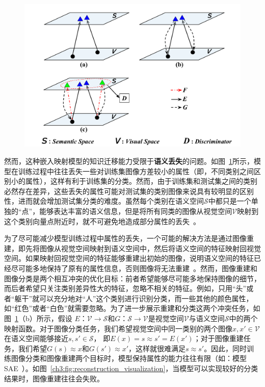 \begin{figure}
    \centering
        \includegraphics[width=0.98\linewidth]{chapter3/res/zsl_paradigms.pdf}
    \label{ch3:fig:zsl_paradigms}
\end{figure}

然而，这种嵌入映射模型的知识迁移能力受限于\textbf{语义丢失}的问题。如图~\ref{ch3:fig:zsl_paradigms}所示，模型在训练过程中往往丢失一些对训练集图像方差较小的属性（即，不同类别之间区别小的属性），这样有利于训练集的分类。然而，由于训练集和测试集之间的类别必然存在差异，这些丢失的属性可能对测试集的类别图像来说具有较明显的区别性，进而就会增加测试集分类的难度。虽然每个类别在语义空间$\mathcal{S}$中都只是一个单独的“点”，能够表达丰富的语义信息，但是将所有同类的图像从视觉空间$\mathcal{V}$映射到这个类别向量点附近时，就不可避免地造成部分属性的丢失~\cite{lazaridou2015hubness,fu2015transductive}。


为了尽可能减少模型训练过程中属性的丢失，一个可能的解决方法是通过图像重建，即先将图像从视觉空间映射到语义空间中，然后将语义空间的特征映射回视觉空间。如果映射回视觉空间的特征能够重建出初始的图像，说明语义空间的特征已经尽可能多地保持了原有的属性信息，否则图像将无法重建~\cite{kim2017learning,yi2017dualgan,zhu2017unpaired,he2016dual}。然而，图像重建和图像分类是两个相互冲突的优化目标：前者希望能够尽可能多地保持图像的细节，而后者希望只关注类别差异性大的特征，忽略不相关的特征。例如，只用“头”或者“躯干”就可以充分地对“人”这个类别进行识别分类，而一些其他的颜色属性，如“红色”或者“白色”就需要忽略。为了进一步展示重建和分类这两个冲突任务，如图~\ref{ch3:fig:zsl_paradigms}（b）所示，假设 $E$：$\mathcal{V}\rightarrow \mathcal{S}$和$G$：$\mathcal{S}\rightarrow \mathcal{V}$是视觉空间$\mathcal{V}$与语义空间$\mathcal{S}$中的两个映射函数。对于图像分类任务，我们希望视觉空间中同一类别的两个图像$x, x'\in \mathcal{V}$在语义空间能够接近$s, s'\in\mathcal{S}$， 即$E(x) = s \approx s' = E(x')$；对于图像重建任务，我们希望$G(s)\approx x$和$G(s')\approx x'$，这样就很难满足$s\approx s'$。因此，同时训练图像分类和图像重建两个目标时，模型保持属性的能力往往有限（如：模型SAE~\cite{kodirov2017semantic}）。如图~\ref{ch3:fig:reconstruction_visualization}，当模型可以实现较好的分类结果时，图像重建往往会失败。

